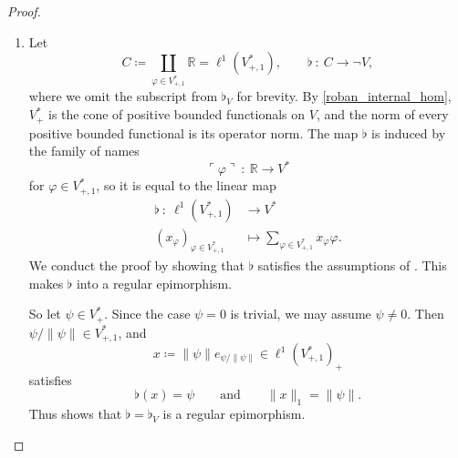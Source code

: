 \documentclass[11pt,onecolumn]{article}
\newcommand{\R}{\mathbb{R}}
\newcommand{\name}[1]{\ulcorner #1 \urcorner}
\theoremstyle{plain}
\theoremstyle{remark}
\theoremstyle{definition}
\begin{document}
\begin{proof}
\begin{enumerate}
			Since for every $v \in V$ there exists $w \in V_+$ with $-w \le v \le w$, we have
			\[
				\sharp(V) = (\sharp(V) \cap P_+) - (\sharp(V) \cap P_+) = E.
			\]
			Concerning the norms,
			it remains to be shown that $\|v\| = \|\sharp(v)\|_E$ for every $v \in V$.
			To this end, note first that
			\begin{align*}
				\|\sharp(v)\|_E
				& =
				\inf \, \{ \|\sharp(w)\|_\infty \mid w \in V_+,\, -w \le v \le w \} \\[2pt]
				& =
				\inf \, \{ \|w\| \mid w \in V_+,\, -w \le v \le w \} \\[2pt]
				& = \|v\|,
			\end{align*}
			where the first step is by the fact that $\sharp$ is an order embedding.
			For the second step, if $w\in V_+$, then $N(-w)=0$, so  gives
			\[
				\|\sharp(w)\|_\infty=\max\{N(w),N(-w)\}=\|w\|.
			\]
			The third step is the definition of regularly ordered Banach space.
		\item Let
			\[
				C \coloneqq \coprod_{\varphi \in V^*_{+,1}} \R = \ell^1(V^*_{+,1}),
				\qquad
				\flat \: : \: C \longrightarrow \neg V,
			\]
			where we omit the subscript from $\flat_V$ for brevity.
			By \cref{roban_internal_hom}, $V^*_+$ is the cone of positive bounded functionals on $V$,
			and the norm of every positive bounded functional is its operator norm.
			The map $\flat$ is induced by the family of names
			\[
				\name{\varphi} \: : \: \R \longrightarrow V^*
			\]
			for $\varphi \in V^*_{+,1}$, so it is equal to the linear map
			\begin{align*}
				\flat \: : \: \ell^1(V^*_{+,1}) & \longrightarrow V^* \\
				(x_\varphi)_{\varphi \in V^*_{+,1}} & \longmapsto \sum_{\varphi \in V^*_{+,1}} x_\varphi \varphi.
			\end{align*}
			We conduct the proof by showing that $\flat$ satisfies the assumptions of .
			This makes $\flat$ into a regular epimorphism.

			So let $\psi \in V^*_+$.
			Since the case $\psi = 0$ is trivial, we may assume $\psi \neq 0$.
			Then $\psi / \|\psi\| \in V^*_{+,1}$, and
			\[
				x \coloneqq \|\psi\| e_{\psi / \|\psi\|} \in \ell^1(V^*_{+,1})_+
			\]
			satisfies
			\[
				\flat(x) = \psi
				\qquad\text{and}\qquad
				\|x\|_1 = \|\psi\|.
			\]
			Thus  shows that $\flat=\flat_V$ is a regular epimorphism.
			\qedhere
	\end{enumerate}
\end{proof}
\end{document}

